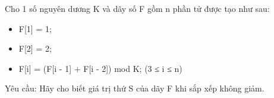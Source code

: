 Cho 1 số nguyên dương K và dãy số F gồm n phần tử được tạo như sau:  
\begin{itemize}
	\item     F[1] = 1;   
	\item     F[2] = 2;   
	\item     F[i] = (F[i - 1] + F[i - 2]) mod K; (3 ≤ i ≤ n)   
\end{itemize}

       Yêu cầu:      Hãy cho biết giá trị thứ S của dãy F khi sắp xếp không giảm.